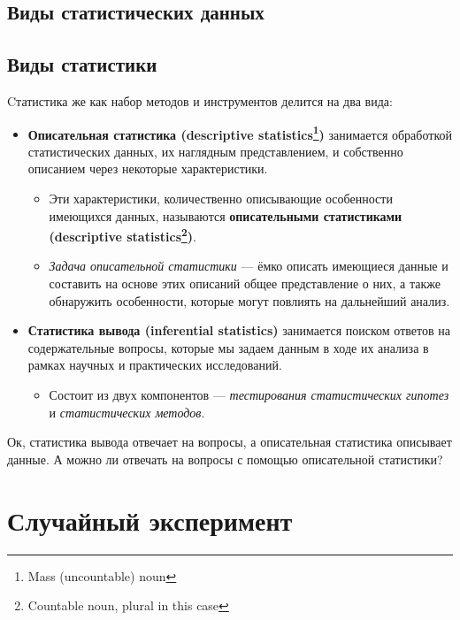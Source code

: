 \documentclass[
  letterpaper,
  DIV=11,
  numbers=noendperiod]{scrreprt}
\providecommand{\tightlist}{%
  \setlength{\itemsep}{0pt}\setlength{\parskip}{0pt}}\usepackage{longtable,booktabs,array}
\theoremstyle{definition}
\theoremstyle{remark}
\begin{document}
\section{Виды статистических данных}\label{stats-data}

\section{Виды статистики}\label{stats-kinds}

Cтатистика же как набор методов и инструментов делится на два вида:

\begin{itemize}
\tightlist
\item
  \textbf{Описательная статистика (descriptive statistics\footnote{Mass
    (uncountable) noun})} занимается обработкой статистических данных,
  их наглядным представлением, и собственно описанием через некоторые
  характеристики.

  \begin{itemize}
  \tightlist
  \item
    Эти характеристики, количественно описывающие особенности имеющихся
    данных, называются \textbf{описательными статистиками (descriptive
    statistics\footnote{Countable noun, plural in this case})}.
  \item
    \emph{Задача описательной статистики} --- ёмко описать имеющиеся
    данные и составить на основе этих описаний общее представление о
    них, а также обнаружить особенности, которые могут повлиять на
    дальнейший анализ.
  \end{itemize}
\item
  \textbf{Статистика вывода (inferential statistics)} занимается поиском
  ответов на содержательные вопросы, которые мы задаем данным в ходе их
  анализа в рамках научных и практических исследований.

  \begin{itemize}
  \tightlist
  \item
    Состоит из двух компонентов --- \emph{тестирования статистических
    гипотез} и \emph{статистических методов}.
  \end{itemize}
\end{itemize}

Ок, статистика вывода отвечает на вопросы, а описательная статистика
описывает данные. А можно ли отвечать на вопросы с помощью описательной
статистики?


\chapter{Случайный эксперимент}\label{stats-rand-exp}
\end{document}
